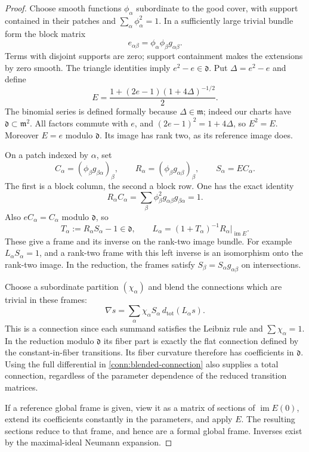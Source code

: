 \begin{proof}
Choose smooth functions \(\phi_\alpha\) subordinate to the good
cover, with support contained in their patches and
\(\sum_\alpha\phi_\alpha^2=1\).  In a sufficiently large trivial
bundle form the block matrix
\[
 e_{\alpha\beta}=\phi_\alpha\phi_\beta g_{\alpha\beta}.
\]
Terms with disjoint supports are zero; support containment makes
the extensions by zero smooth.  The triangle identities imply
\(e^2-e\in\mathfrak d\).  Put \(\Delta=e^2-e\) and define
\begin{equation}
 E=\frac{1+(2e-1)(1+4\Delta)^{-1/2}}2 .
 \label{conn:idempotent}
\end{equation}
The binomial series is defined formally because
\(\Delta\in\mathfrak m\); indeed our charts have
\(\mathfrak d\subset\mathfrak m^2\).
All factors commute with \(e\), and
\((2e-1)^2=1+4\Delta\), so \(E^2=E\).
Moreover \(E=e\) modulo \(\mathfrak d\).
Its image has rank two, as its reference image does.

On a patch indexed by \(\alpha\), set
\[
 C_\alpha=(\phi_\beta g_{\beta\alpha})_\beta,\qquad
 R_\alpha=(\phi_\beta g_{\alpha\beta})_\beta,\qquad
 S_\alpha=EC_\alpha .
\]
The first is a block column, the second a block row.  One has the
exact identity
\begin{equation}
 R_\alpha C_\alpha
       =\sum_\beta\phi_\beta^2g_{\alpha\beta}g_{\beta\alpha}
       =1.
 \label{conn:row-column}
\end{equation}
Also \(eC_\alpha=C_\alpha\) modulo \(\mathfrak d\), so
\[
 T_\alpha:=R_\alpha S_\alpha-1\in\mathfrak d,\qquad
 L_\alpha=(1+T_\alpha)^{-1}R_\alpha\big|_{\operatorname{im}E}.
\]
These give a frame and its inverse on the rank-two image bundle.
For example \(L_\alpha S_\alpha=1\), and a rank-two frame with
this left inverse is an isomorphism onto the rank-two image.
In the reduction, the frames satisfy
\(S_\beta=S_\alpha g_{\alpha\beta}\) on intersections.

Choose a subordinate partition \((\chi_\alpha)\) and blend the
connections which are trivial in these frames:
\begin{equation}
 \nabla s=\sum_\alpha\chi_\alpha
                    S_\alpha\,d_{\mathrm{tot}}(L_\alpha s).
 \label{conn:blended-connection}
\end{equation}
This is a connection since each summand satisfies the Leibniz
rule and \(\sum\chi_\alpha=1\).  In the reduction modulo
\(\mathfrak d\) its fiber part is exactly the flat connection
defined by the constant-in-fiber transitions.  Its fiber
curvature therefore has coefficients in \(\mathfrak d\).
Using the full differential in \eqref{conn:blended-connection}
also supplies a total connection, regardless of the parameter
dependence of the reduced transition matrices.

If a reference global frame is given, view it as a matrix of
sections of \(\operatorname{im}E(0)\), extend its coefficients
constantly in the parameters, and apply \(E\).  The resulting
sections reduce to that frame, and hence are a formal global
frame.  Inverses exist by the maximal-ideal Neumann expansion.
\end{proof}

